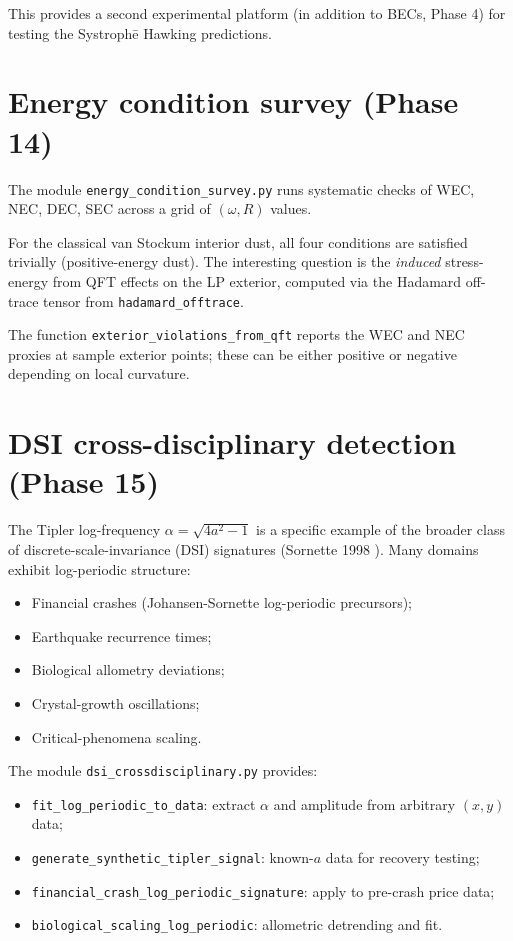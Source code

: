 \documentclass[11pt,a4paper]{article}
\begin{document}
This provides a second experimental platform (in addition to BECs,
Phase 4) for testing the Systroph\=e Hawking predictions.

\section{Energy condition survey (Phase 14)}

The module \texttt{energy\_condition\_survey.py} runs systematic
checks of WEC, NEC, DEC, SEC across a grid of $(\omega, R)$ values.

For the classical van Stockum interior dust, all four conditions are
satisfied trivially (positive-energy dust). The interesting question
is the \emph{induced} stress-energy from QFT effects on the LP
exterior, computed via the Hadamard off-trace tensor from
\texttt{hadamard\_offtrace}.

The function \texttt{exterior\_violations\_from\_qft} reports the
WEC and NEC proxies at sample exterior points; these can be either
positive or negative depending on local curvature.

\section{DSI cross-disciplinary detection (Phase 15)}

The Tipler log-frequency $\alpha = \sqrt{4 a^2 - 1}$ is a specific
example of the broader class of discrete-scale-invariance (DSI)
signatures (Sornette 1998 \cite{Sornette1998}). Many domains exhibit
log-periodic structure:
\begin{itemize}
\item Financial crashes (Johansen-Sornette log-periodic precursors);
\item Earthquake recurrence times;
\item Biological allometry deviations;
\item Crystal-growth oscillations;
\item Critical-phenomena scaling.
\end{itemize}

The module \texttt{dsi\_crossdisciplinary.py} provides:
\begin{itemize}
\item \texttt{fit\_log\_periodic\_to\_data}: extract $\alpha$ and
  amplitude from arbitrary $(x, y)$ data;
\item \texttt{generate\_synthetic\_tipler\_signal}: known-$a$ data
  for recovery testing;
\item \texttt{financial\_crash\_log\_periodic\_signature}: apply to
  pre-crash price data;
\item \texttt{biological\_scaling\_log\_periodic}: allometric
  detrending and fit.
\end{itemize}
\end{document}
